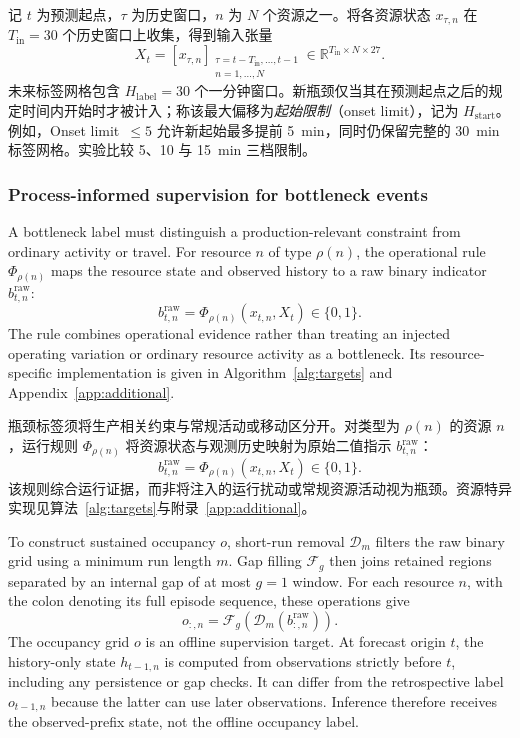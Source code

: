 \documentclass[a4paper,fleqn]{cas-dc}
\newcommand{\zhpara}[1]{%
  \par\begingroup\small\color{black!72}\noindent #1\par\endgroup}
\begin{document}
\zhpara{记 $t$ 为预测起点，$\tau$ 为历史窗口，$n$ 为 $N$ 个资源之一。将各资源状态 $x_{\tau,n}$ 在 $T_{\mathrm{in}}=30$ 个历史窗口上收集，得到输入张量
\begin{equation}
X_t=\left[x_{\tau,n}\right]_
{\substack{\tau=t-T_{\mathrm{in}},\ldots,t-1\\n=1,\ldots,N}}
\in\mathbb{R}^{T_{\mathrm{in}}\times N\times 27}.
\end{equation}
未来标签网格包含 $H_{\mathrm{label}}=30$ 个一分钟窗口。新瓶颈仅当其在预测起点之后的规定时间内开始时才被计入；称该最大偏移为\emph{起始限制}（onset limit），记为 $H_{\mathrm{start}}$。例如，Onset limit~$\leq5$ 允许新起始最多提前 5~min，同时仍保留完整的 30~min 标签网格。实验比较 5、10 与 15~min 三档限制。}


\subsubsection{Process-informed supervision for bottleneck events}

A bottleneck label must distinguish a production-relevant constraint from ordinary activity or travel. For resource $n$ of type $\rho(n)$, the operational rule $\Phi_{\rho(n)}$ maps the resource state and observed history to a raw binary indicator $b^{\mathrm{raw}}_{t,n}$:
\begin{equation}
b^{\mathrm{raw}}_{t,n}=\Phi_{\rho(n)}(x_{t,n},X_t)\in\{0,1\}.
\end{equation}
The rule combines operational evidence rather than treating an injected operating variation or ordinary resource activity as a bottleneck. Its resource-specific implementation is given in Algorithm~\ref{alg:targets} and Appendix~\ref{app:additional}.

\zhpara{瓶颈标签须将生产相关约束与常规活动或移动区分开。对类型为 $\rho(n)$ 的资源 $n$，运行规则 $\Phi_{\rho(n)}$ 将资源状态与观测历史映射为原始二值指示 $b^{\mathrm{raw}}_{t,n}$：
\begin{equation}
b^{\mathrm{raw}}_{t,n}=\Phi_{\rho(n)}(x_{t,n},X_t)\in\{0,1\}.
\end{equation}
该规则综合运行证据，而非将注入的运行扰动或常规资源活动视为瓶颈。资源特异实现见算法~\ref{alg:targets}与附录~\ref{app:additional}。}


To construct sustained occupancy $o$, short-run removal $\mathcal{D}_{m}$ filters the raw binary grid using a minimum run length $m$. Gap filling $\mathcal{F}_{g}$ then joins retained regions separated by an internal gap of at most $g=1$ window. For each resource $n$, with the colon denoting its full episode sequence, these operations give
\begin{equation}
o_{:,n}=\mathcal{F}_{g}\!\left(\mathcal{D}_{m}
\left(b^{\mathrm{raw}}_{:,n}\right)\right).
\end{equation}
The occupancy grid $o$ is an offline supervision target. At forecast origin $t$, the history-only state $h_{t-1,n}$ is computed from observations strictly before $t$, including any persistence or gap checks. It can differ from the retrospective label $o_{t-1,n}$ because the latter can use later observations. Inference therefore receives the observed-prefix state, not the offline occupancy label.
\end{document}
